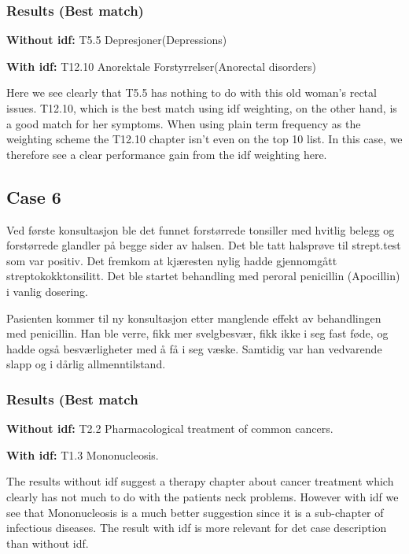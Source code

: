 \subsubsection{Results (Best match)}
\begin{description}
\item{\textbf{Without idf: }}T5.5 Depresjoner(Depressions)
\item{\textbf{With idf: }}T12.10 Anorektale Forstyrrelser(Anorectal disorders)
\end{description}

Here we see clearly that T5.5 has nothing to do with this old woman’s rectal issues. T12.10, which is the best match using idf weighting, on the other hand, is a good match for her symptoms. When using plain term frequency as the weighting scheme the T12.10 chapter isn’t even on the top 10 list. In this case, we therefore see a clear performance gain from the idf weighting here.

\subsection{Case 6}
Ved første konsultasjon ble det funnet forstørrede tonsiller med hvitlig belegg og forstørrede glandler på begge sider av halsen. Det ble tatt halsprøve til strept.test som var positiv. Det fremkom at kjæresten nylig hadde gjennomgått streptokokktonsilitt. Det ble startet behandling med peroral penicillin (Apocillin) i vanlig dosering.

Pasienten kommer til ny konsultasjon etter manglende effekt av behandlingen med penicillin. Han ble verre, fikk mer svelgbesvær, fikk ikke i seg fast føde, og hadde også besværligheter med å få i seg væske. Samtidig var han vedvarende slapp og i dårlig allmenntilstand.

\subsubsection{Results (Best match}
\begin{description}
\item{\textbf{Without idf: }}T2.2 Pharmacological treatment of common cancers.
\item{\textbf{With idf: }}T1.3 Mononucleosis.
\end{description}
The results without idf suggest a therapy chapter about cancer treatment which clearly has not much to do with the patients neck problems. However with idf we see that Mononucleosis is a much better suggestion since it is a sub-chapter of infectious diseases. The result with idf is more relevant for det case description than without idf.